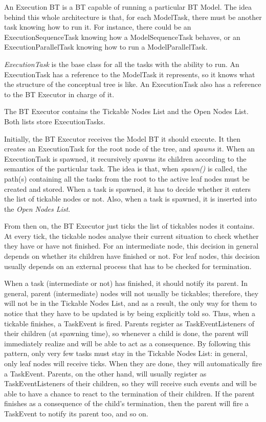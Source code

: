 \documentclass[a4paper,10pt]{article}
\begin{document}
An Execution BT is a BT capable of running a particular BT Model. The idea behind this whole architecture is that, for each ModelTask, there must be another task knowing how to run it. For instance, there could be an ExecutionSequenceTask knowing how a ModelSequenceTask behaves, or an ExecutionParallelTask knowing how to run a ModelParallelTask. 

\textit{ExecutionTask} is the base class for all the tasks with the ability to run. An ExecutionTask has a reference to the ModelTask it represents, so it knows what the structure of the conceptual tree is like. An ExecutionTask also has a reference to the BT Executor in charge of it.

The BT Executor contains the Tickable Nodes List and the Open Nodes List. Both lists store ExecutionTasks.

Initially, the BT Executor receives the Model BT it should execute. It then creates an ExecutionTask for the root node of the tree, and \textit{spawns} it. When an ExecutionTask is spawned, it recursively spawns its children according to the semantics of the particular task. The idea is that, when \textit{spawn()} is called, the path(s) containing all the tasks from the root to the active leaf nodes must be created and stored. When a task is spawned, it has to decide whether it enters the list of tickable nodes or not. Also, when a task is spawned, it is inserted into the \textit{Open Nodes List}.

From then on, the BT Executor just ticks the list of tickables nodes it contains. At every tick, the tickable nodes analyse their current situation to check whether they have or have not finished. For an intermediate node, this decision in general depends on whether its children have finished or not. For leaf nodes, this decision usually depends on an external process that has to be checked for termination.

When a task (intermediate or not) has finished, it should notify its parent. In general, parent (intermediate) nodes will not usually be tickables; therefore, they will not be in the Tickable Nodes List, and as a result, the only way for them to notice that they have to be updated is by being explicitly told so. Thus, when a tickable finishes, a TaskEvent is fired. Parents register as TaskEventListeners of their children (at spawning time), so whenever a child is done, the parent will immediately realize and will be able to act as a consequence. By following this pattern, only very few tasks must stay in the Tickable Nodes List: in general, only leaf nodes will receive ticks. When they are done, they will automatically fire a TaskEvent. Parents, on the other hand, will usually register as TaskEventListeners of their children, so they will receive such events and will be able to have a chance to react to the termination of their children. If the parent finishes as a consequence of the child's termination, then the parent will fire a TaskEvent to notify its parent too, and so on.
\end{document}
